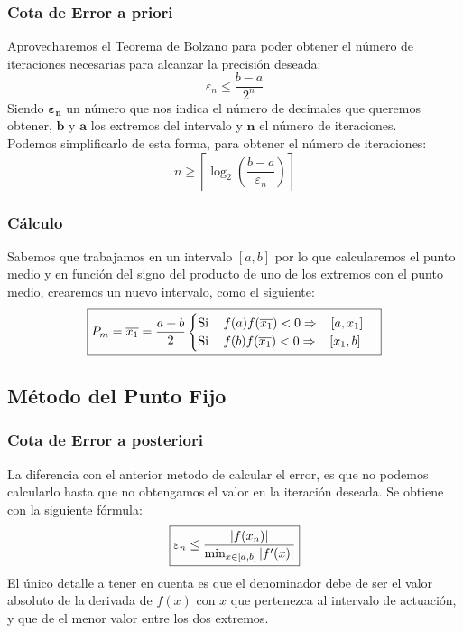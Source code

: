 \subsubsection{Cota de Error a priori}
 Aprovecharemos el \underline{Teorema de Bolzano} para poder obtener el número de iteraciones necesarias para alcanzar la precisión deseada:
\[
        \boxed{\varepsilon_n \leq \frac{b-a}{2^n}}
\]
 Siendo \(\mathbf{\varepsilon_n}\) un número que nos indica el número de decimales que queremos obtener, \(\mathbf{b}\) y \(\mathbf{a}\) los extremos del intervalo y \(\mathbf{n}\) el número de iteraciones.\\ Podemos simplificarlo de esta forma, para obtener el número de iteraciones:
\[
        \boxed{n\geq \left \lceil \log_2{\left ( \frac{b-a}{\varepsilon_n} \right )} \right \rceil}
\]
\subsubsection{Cálculo}
 Sabemos que trabajamos en un intervalo \([a,b]\) por lo que calcularemos el punto medio y en función del signo del producto de uno de los extremos con el punto medio, crearemos un nuevo intervalo, como el siguiente:
\[
        \boxed{P_m = \overline{x_1} = \frac{a+b}{2}
                \begin{cases}
                        \text{Si \hspace{3mm}} f(a)f(\overline{x_1}) < 0  \Rightarrow \text{\hspace{3mm}} [a, x_1] \\
                        \text{Si \hspace{3mm}} f(b)f(\overline{x_1}) < 0 \Rightarrow\text{\hspace{3mm}} [x_1, b]
                \end{cases}}
\]
\subsection{Método del Punto Fijo}
\subsubsection{Cota de Error a posteriori}
 La diferencia con el anterior metodo de calcular el error, es que no podemos calcularlo hasta que no obtengamos el valor en la iteración deseada. Se obtiene con la siguiente fórmula:
\[
        \boxed{\varepsilon_n \leq\frac{\left | f(x_n) \right |}{\textnormal{min}_{x \in [a,b]}\left | f'(x) \right |}}
\]
 El único detalle a tener en cuenta es que el denominador debe de ser el valor absoluto de la derivada de \(f(x)\) con \(x\) que pertenezca al intervalo de actuación, y que de el menor valor entre los dos extremos.
